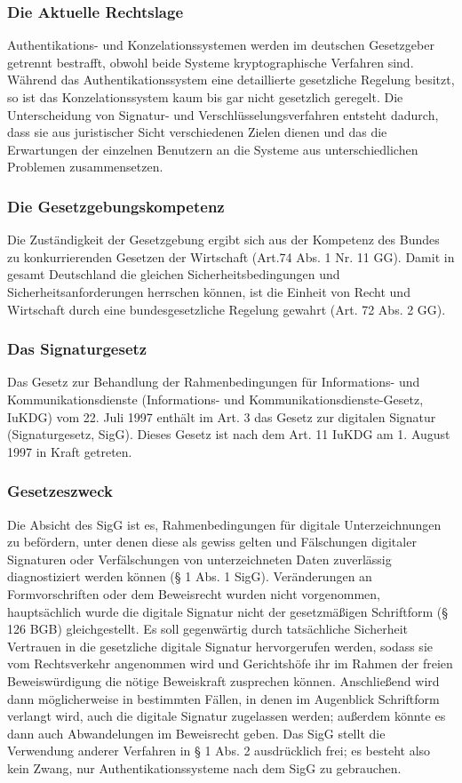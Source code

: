 \subsubsection{Die Aktuelle Rechtslage}
Authentikations- und Konzelationssystemen werden im deutschen Gesetzgeber getrennt bestrafft, obwohl beide Systeme kryptographische Verfahren sind. Während das Authentikationssystem eine detaillierte gesetzliche Regelung besitzt, so ist das Konzelationssystem kaum bis gar nicht gesetzlich geregelt. Die Unterscheidung von Signatur- und Verschlüsselungsverfahren entsteht dadurch, dass sie aus juristischer Sicht verschiedenen Zielen dienen und das die Erwartungen der einzelnen Benutzern an die Systeme aus unterschiedlichen Problemen zusammensetzen.


\subsubsection{Die Gesetzgebungskompetenz}
Die Zuständigkeit der Gesetzgebung ergibt sich aus der Kompetenz des Bundes zu konkurrierenden Gesetzen der Wirtschaft (Art.74 Abs. 1 Nr. 11 GG). Damit in gesamt Deutschland die gleichen Sicherheitsbedingungen und Sicherheitsanforderungen herrschen können, ist die Einheit von Recht und Wirtschaft durch eine bundesgesetzliche Regelung gewahrt (Art. 72 Abs. 2 GG).

\subsubsection{Das Signaturgesetz}
Das Gesetz zur Behandlung der Rahmenbedingungen für Informations- und Kommunikationsdienste (Informations- und Kommunikationsdienste-Gesetz, IuKDG) vom 22. Juli 1997 enthält im Art. 3 das Gesetz zur digitalen Signatur (Signaturgesetz, SigG). Dieses Gesetz ist nach dem Art. 11 IuKDG am 1. August 1997 in Kraft getreten.

\subsubsection{Gesetzeszweck}
Die Absicht des SigG ist es, Rahmenbedingungen für digitale Unterzeichnungen zu befördern, unter denen diese als gewiss gelten und Fälschungen digitaler Signaturen oder Verfälschungen von unterzeichneten Daten zuverlässig diagnostiziert werden können (§ 1 Abs. 1 SigG). Veränderungen an Formvorschriften oder dem Beweisrecht wurden nicht vorgenommen, hauptsächlich wurde die digitale Signatur nicht der gesetzmäßigen Schriftform (§ 126 BGB) gleichgestellt. Es soll gegenwärtig durch tatsächliche Sicherheit Vertrauen in die gesetzliche digitale Signatur hervorgerufen werden, sodass sie vom Rechtsverkehr angenommen wird und Gerichtshöfe ihr im Rahmen der freien Beweiswürdigung die nötige Beweiskraft zusprechen können. Anschließend wird dann möglicherweise in bestimmten Fällen, in denen im Augenblick Schriftform verlangt wird, auch die digitale Signatur zugelassen werden; außerdem könnte es dann auch Abwandelungen im Beweisrecht geben. Das SigG stellt die Verwendung anderer Verfahren in § 1 Abs. 2 ausdrücklich frei; es besteht also kein Zwang, nur Authentikationssysteme nach dem SigG zu gebrauchen.

